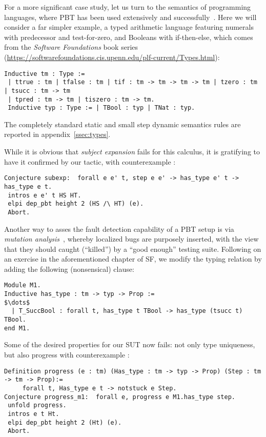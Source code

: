 
For a more significant case study, let us turn to the semantics of
programming languages, where PBT has been used extensively and
successfully~\cite{Klein12}. Here we will consider a far simpler example,
a typed arithmetic language featuring numerals with predecessor  and test-for-zero, 
and Booleans with if-then-else, which comes from the \emph{Software Foundations} book series (\url{https://softwarefoundations.cis.upenn.edu/plf-current/Types.html}):
\begin{lstlisting}
Inductive tm : Type :=
 | ttrue : tm | tfalse : tm | tif : tm -> tm -> tm -> tm | tzero : tm | tsucc : tm -> tm
 | tpred : tm -> tm | tiszero : tm -> tm.
 Inductive typ : Type := | TBool : typ | TNat : typ.
\end{lstlisting}
The completely standard static and small step dynamic semantics rules are
reported in appendix~\ref{ssec:types}.

While it is obvious that \emph{subject expansion} fails for this calculus, it is gratifying to have it confirmed by our tactic, with counterexample :
\begin{lstlisting}
Conjecture subexp:  forall e e' t, step e e' -> has_type e' t -> has_type e t. 
 intros e e' t HS HT.
 elpi dep_pbt height 2 (HS /\ HT) (e).
 Abort.
\end{lstlisting}


Another way to asses the fault detection capability of a PBT setup is via \emph{mutation analysis}~\cite{CavadaCM20}, whereby localized bugs are purposely inserted, with the view that they should caught (``killed'') by a ``good enough'' testing suite. Following on  an exercise in the aforementioned chapter of SF, we modify the typing relation by adding the following (nonsensical)  clause:

\begin{lstlisting}
Module M1.
Inductive has_type : tm -> typ -> Prop :=
$\dots$
  | T_SuccBool : forall t, has_type t TBool -> has_type (tsucc t) TBool.
end M1.
\end{lstlisting}
Some of the desired properties for our SUT now fails: not
only type uniqueness, but also progress with counterexample :
\begin{lstlisting}
Definition progress (e : tm) (Has_type : tm -> typ -> Prop) (Step : tm -> tm -> Prop):= 
     forall t, Has_type e t -> notstuck e Step.
Conjecture progress_m1:  forall e, progress e M1.has_type step.
 unfold progress.
 intros e t Ht.    
 elpi dep_pbt height 2 (Ht) (e).
 Abort.
\end{lstlisting}

